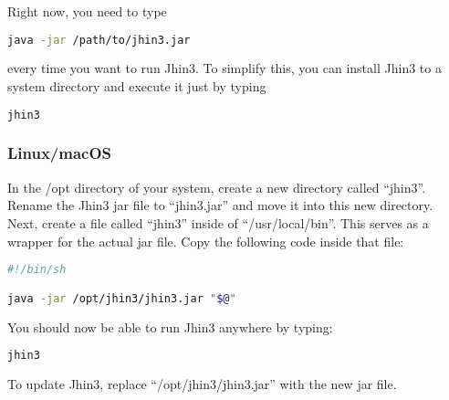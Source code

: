 Right now, you need to type
\begin{lstlisting}[language=bash]
java -jar /path/to/jhin3.jar
\end{lstlisting}
every time you want to run Jhin3. To simplify this, you can install Jhin3 to a system directory and execute it just by typing
\begin{lstlisting}[language=bash]
jhin3
\end{lstlisting}

\subsubsection{Linux/macOS}

In the /opt directory of your system, create a new directory called ``jhin3''. Rename the Jhin3 jar file to ``jhin3.jar'' and move it into this new directory.
Next, create a file called ``jhin3'' inside of ``/usr/local/bin''. This serves as a wrapper for the actual jar file.
Copy the following code inside that file:

\begin{lstlisting}[language=bash]
#!/bin/sh

java -jar /opt/jhin3/jhin3.jar "$@"
\end{lstlisting}

You should now be able to run Jhin3 anywhere by typing:
\begin{lstlisting}[language=bash]
jhin3
\end{lstlisting}

To update Jhin3, replace ``/opt/jhin3/jhin3.jar'' with the new jar file.
